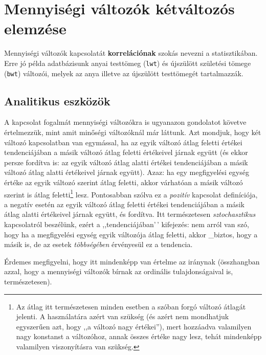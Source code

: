 \documentclass[
]{book}
\begin{document}
\hypertarget{deskriptivmennyketvalt}{%
\section{Mennyiségi változók kétváltozós elemzése}\label{deskriptivmennyketvalt}}

Mennyiségi változók kapcsolatát \textbf{korrelációnak} szokás nevezni a statisztikában. Erre jó példa adatbázisunk anyai testtömeg (\texttt{lwt}) és újszülött születési tömege (\texttt{bwt}) változói, melyek az anya illetve az újszülött testtömegét tartalmazzák.

\hypertarget{deskriptivmennyketvaltanalitikus}{%
\subsection{Analitikus eszközök}\label{deskriptivmennyketvaltanalitikus}}

A kapcsolat fogalmát mennyiségi változókra is ugyanazon gondolatot követve értelmezzük, mint amit minőségi változóknál már láttunk. Azt mondjuk, hogy két változó kapcsolatban van egymással, ha az egyik változó átlag feletti értékei tendenciájában a másik változó átlag feletti értékeivel járnak együtt (és ekkor persze fordítva is: az egyik változó átlag alatti értékei tendenciájában a másik változó átlag alatti értékeivel járnak együtt). Azaz: ha egy megfigyelési egység értéke az egyik változó szerint átlag feletti, akkor várhatóan a másik változó szerint is átlag feletti\footnote{Az átlag itt természetesen minden esetben a szóban forgó változó átlagát jelenti. A használatára azért van szükség (és azért nem mondhatjuk egyszerűen azt, hogy ,,a változó nagy értékei''), mert hozzáadva valamilyen nagy konstanst a változóhoz, annak összes értéke nagy lesz, tehát mindenképp valamilyen viszonyításra van szükség.} lesz. Pontosabban szólva ez a \emph{pozitív} kapcsolat definíciója, a negatív esetén az egyik változó átlag feletti értékei tendenciájában a másik átlag alatti értékeivel járnak együtt, és fordítva. Itt természetesen \emph{sztochasztikus} kapcsolatról beszélünk, ezért a ,,tendenciájában'\,' kifejezés: nem arról van szó, hogy ha a megfigyelési egység egyik változója átlag feletti, akkor \_biztos, hogy a másik is, de az esetek \emph{többségében} érvényesül ez a tendencia.

Érdemes megfigyelni, hogy itt mindenképp van értelme az iránynak (összhangban azzal, hogy a mennyiségi változók bírnak az ordinális tulajdonságaival is, természetesen).
\end{document}
